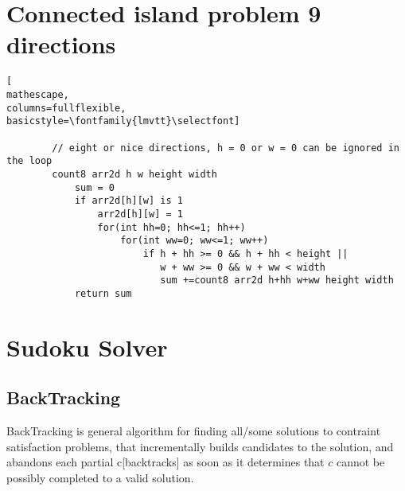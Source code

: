\documentclass{article}
\begin{document}
\begin{center}
\end{center}

\pagebreak
\section{Connected island problem 9 directions}
\begin{lstlisting}[
mathescape,
columns=fullflexible,
basicstyle=\fontfamily{lmvtt}\selectfont]

        // eight or nice directions, h = 0 or w = 0 can be ignored in the loop
        count8 arr2d h w height width
            sum = 0
            if arr2d[h][w] is 1
                arr2d[h][w] = 1
                for(int hh=0; hh<=1; hh++)
                    for(int ww=0; ww<=1; ww++)
                        if h + hh >= 0 && h + hh < height ||
                           w + ww >= 0 && w + ww < width
                           sum +=count8 arr2d h+hh w+ww height width
            return sum 
\end{lstlisting} 

\begin{center}
\end{center}

\section{Sudoku Solver}
\subsection{BackTracking}
BackTracking is general algorithm for finding all/some solutions to contraint satisfaction problems,
that incrementally builds candidates to the solution, and abandons each partial c[backtracks] as soon
as it determines that $c$ cannot be possibly completed to a valid solution. \\
\end{document}
